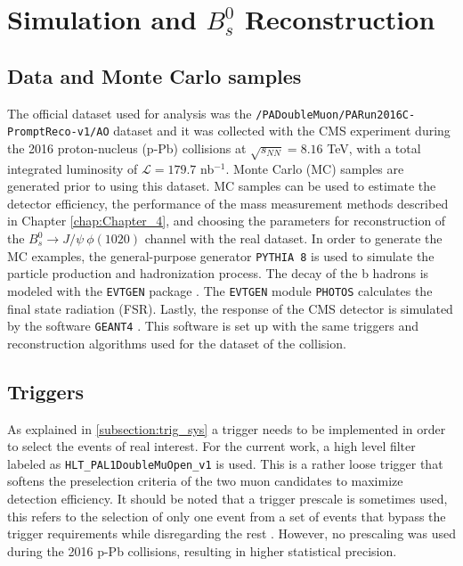 \chapter[\leavevmode\newline Simulation and $B^0_s$ Reconstruction]{Simulation and $B^0_s$ Reconstruction}
\label{chap:Chapter_3}
\section{Data and Monte Carlo samples}
The official dataset used for analysis was the \verb|/PADoubleMuon/PARun2016C-PromptReco-v1/AO| dataset and it was collected with the CMS experiment during the 2016 proton-nucleus (p-Pb) collisions at $\sqrt{s_{NN}} = 8.16$ TeV, with a total integrated luminosity of $\mathcal{L} = 179.7$ nb$^{-1}$. Monte Carlo (MC) samples are generated prior to using this dataset. MC samples can be used to estimate the detector efficiency, the performance of the mass measurement methods described in Chapter \ref{chap:Chapter_4}, and choosing the parameters for reconstruction  of the $B^0_s \to J/\psi \ \phi(1020)$ channel with the real dataset. In order to generate the MC examples, the general-purpose generator \verb|PYTHIA 8| \cite{sjostrand2015introduction} is used to simulate the particle production and hadronization process. The decay of the b hadrons is modeled with the \verb|EVTGEN| package \cite{lange2001evtgen}. The \verb|EVTGEN| module \verb|PHOTOS| \cite{davidson2016photos} calculates the final state radiation (FSR). Lastly, the response of the CMS detector is simulated by the software \verb|GEANT4| \cite{agostinelli2003geant4}. This software is set up with the same triggers and reconstruction algorithms used for the dataset of the collision. %

\section{Triggers}
As explained in \ref{subsection:trig_sys} a trigger needs to be implemented in order to select the events of real interest. For the current work, a high level filter labeled as \verb|HLT_PAL1DoubleMuOpen_v1| is used. This is a rather loose trigger that softens the preselection criteria of the two muon candidates to maximize detection efficiency. It should be noted that a trigger prescale is sometimes used, this refers to the selection of only one event from a set of events that bypass the trigger requirements while disregarding the rest \cite{dorigo_2014}. However, no prescaling was used during the 2016 p-Pb collisions, resulting in higher statistical precision.

